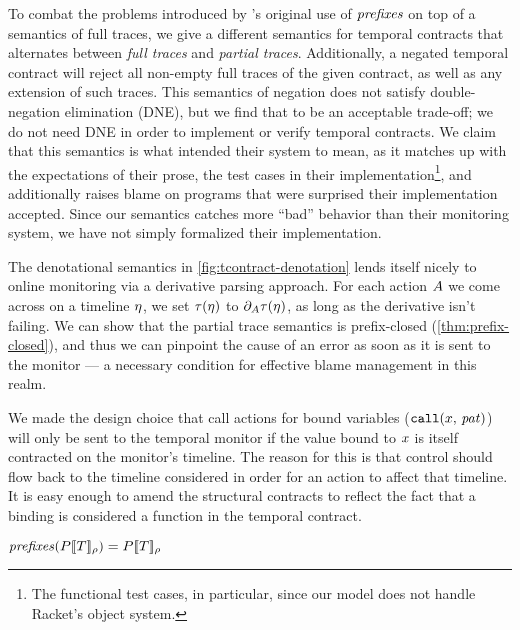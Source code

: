 %
To combat the problems introduced by \dfm's original use of $\mathit{prefixes}$ on top of a semantics of full traces, we give a different semantics for temporal contracts that alternates between \emph{full traces} and \emph{partial traces}.
%
Additionally, a negated temporal contract will reject all non-empty full traces of the given contract, as well as any extension of such traces.
%
This semantics of negation does not satisfy double-negation elimination (DNE), but we find that to be an acceptable trade-off; we do not need DNE in order to implement or verify temporal contracts.
%
We claim that this semantics is what \dfm{} intended their system to mean, as it matches up with the expectations of their prose, the test cases in their implementation\footnote{The functional test cases, in particular, since our model does not handle Racket's object system.}, and additionally raises blame on programs that \dfm{} were surprised their implementation accepted.
%
Since our semantics catches more ``bad'' behavior than their monitoring system, we have not simply formalized their implementation.

The denotational semantics in \autoref{fig:tcontract-denotation} lends itself nicely to online monitoring via a derivative parsing approach.
%
For each action $A$ we come across on a timeline $\eta$, we set $\tau(\eta)$ to $\partial_{A}{\tau(\eta)}$, as long as the derivative isn't failing.
%
We can show that the partial trace semantics is prefix-closed (\autoref{thm:prefix-closed}), and thus we can pinpoint the cause of an error as soon as it is sent to the monitor --- a necessary condition for effective blame management in this realm.

We made the design choice that call actions for bound variables (${\tt call}(x,\, \mathit{pat})$) will only be sent to the temporal monitor if the value bound to $x$ is itself contracted on the monitor's timeline.
%
The reason for this is that control should flow back to the timeline considered in order for an action to affect that timeline.
%
It is easy enough to amend the structural contracts to reflect the fact that a binding is considered a function in the temporal contract.

\begin{theorem}\label{thm:prefix-closed}
  $\mathit{prefixes}(P[\![ T ]\!]_{\rho}) = P[\![ T ]\!]_{\rho}$
\end{theorem}


